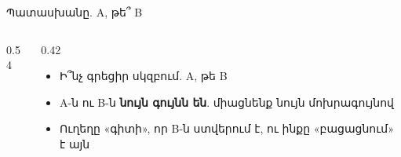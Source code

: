 \begin{frame}{Պատասխանը. A, թե՞ B}
  \begin{columns}[c]
    \begin{column}{0.54\textwidth}
      \centering
      
    \end{column}
    \begin{column}{0.42\textwidth}
      \begin{itemize}
        \item Ի՞նչ գրեցիր սկզբում. A, թե B
        \item<2-> A-ն ու B-ն \textbf{նույն գույնն են}. միացնենք նույն մոխրագույնով
        \item<3-> Ուղեղը «գիտի», որ B-ն ստվերում է, ու ինքը «բացացնում» է այն
      \end{itemize}
    \end{column}
  \end{columns}
\end{frame}

